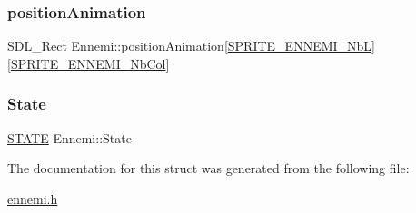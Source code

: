 \subsubsection{\texorpdfstring{position\+Animation}{positionAnimation}}
{\footnotesize\ttfamily S\+D\+L\+\_\+\+Rect Ennemi\+::position\+Animation\mbox{[}\hyperlink{defs_8h_a5fcf3661be891bf3ecb5c3b0e8489a1b}{S\+P\+R\+I\+T\+E\+\_\+\+E\+N\+N\+E\+M\+I\+\_\+\+NbL}\mbox{]}\mbox{[}\hyperlink{defs_8h_aed42758993e14b4e7f601777bebea3ef}{S\+P\+R\+I\+T\+E\+\_\+\+E\+N\+N\+E\+M\+I\+\_\+\+Nb\+Col}\mbox{]}}

\mbox{\label{structEnnemi_ae860384c5289844a9076ca5d45ebc967}} 
\subsubsection{\texorpdfstring{State}{State}}
{\footnotesize\ttfamily \hyperlink{ennemi_8h_a275a67132f10277ada3a0ee3d616b647}{S\+T\+A\+TE} Ennemi\+::\+State}



The documentation for this struct was generated from the following file\+:\begin{DoxyCompactItemize}
\item 
\hyperlink{ennemi_8h}{ennemi.\+h}\end{DoxyCompactItemize}

